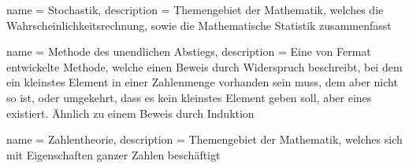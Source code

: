     {
        name = Stochastik,
        description = {Themengebiet der Mathematik, welches die Wahrscheinlichkeitsrechnung, sowie die Mathematische Statistik zusammenfasst}
    }
    
    {
        name = Methode des unendlichen Abstiegs,
        description = {Eine von Fermat entwickelte Methode, welche einen Beweis durch Widerspruch beschreibt, bei dem ein kleinstes Element in einer Zahlenmenge vorhanden sein muss, dem aber nicht so ist, oder umgekehrt, dass es kein kleinstes Element geben soll, aber eines existiert. Ähnlich zu einem Beweis durch Induktion}
    }
    
    {
        name = Zahlentheorie,
        description = {Themengebiet der Mathematik, welches sich mit Eigenschaften ganzer Zahlen beschäftigt}
    }
